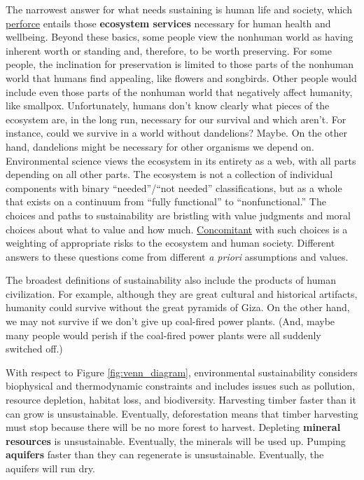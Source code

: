 \documentclass{article}\usepackage[]{graphicx}\usepackage[]{xcolor}
\begin{document}
The narrowest answer for what needs sustaining is human life and society, which
\href{https://www.merriam-webster.com/dictionary/perforce}{perforce}
entails those \textbf{ecosystem services}
necessary for human health and wellbeing.
Beyond these basics, some people view the nonhuman world as having inherent 
worth or standing and, therefore, to be worth preserving.
For some people, the inclination for preservation is limited to those parts
of the nonhuman world that humans find appealing, like flowers and songbirds.
Other people would include even those parts of the nonhuman world that negatively
affect humanity, like smallpox.
Unfortunately, humans don’t know clearly what pieces of the ecosystem
are, in the long run, necessary for our survival and which aren’t.
For instance, could we survive in a world without dandelions?
Maybe.
On the other hand, dandelions might be necessary for other organisms we depend on.
Environmental science views the ecosystem in its entirety as a web, with all parts
depending on all other parts.
The ecosystem is not a collection of individual components with binary ``needed''/``not
needed'' classifications, but as a whole that exists on a continuum from ``fully functional''
to ``nonfunctional.''
The choices and paths to sustainability are bristling with value judgments and
moral choices about what to value and how much.
\href{https://en.wiktionary.org/wiki/concomitant}{Concomitant} with such choices
is a weighting of appropriate risks to the ecosystem and human society.
Different answers to these questions come from different \emph{a priori} assumptions and values.

The broadest definitions of sustainability
also include the products of human civilization.
For example, although they are great cultural and historical artifacts,
humanity could survive without the great pyramids of Giza.
On the other hand, we may not survive if we don’t give up coal-fired power plants.
(And, maybe many people would perish if the coal-fired power plants
were all suddenly switched off.)

With respect to Figure \ref{fig:venn_diagram}, environmental sustainability
considers biophysical and thermodynamic constraints and includes issues such as
pollution, resource depletion, habitat loss, and biodiversity.
Harvesting timber faster than it can grow is unsustainable.
Eventually, deforestation means that timber harvesting must stop because there
will be no more forest to harvest.
Depleting \textbf{mineral resources} is unsustainable.
Eventually, the minerals will be used up.
Pumping \textbf{aquifers} faster than they can regenerate is unsustainable.
Eventually, the aquifers will run dry.
\end{document}
